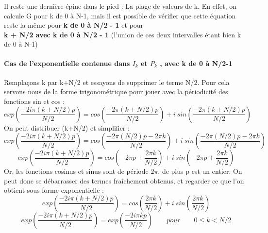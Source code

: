 \documentclass{article}
\begin{document}
Il reste une dernière épine dans le pied : La plage de valeurs de k. En effet, on calcule G pour k de 0 à N-1, mais il est possible de vérifier que cette équation reste la même pour \textbf{k de 0 à N/2 - 1} et pour \\\textbf{k + N/2 avec k de 0 à N/2 - 1} (l'union de ces deux intervalles étant bien k de 0 à N-1)\\~\\

\noindent\qquad \textbf{Cas de l'exponentielle contenue dans $I_{k}$ et $P_{k}$ , avec k de 0 à N/2-1}\\~\\
Remplaçons k par k+N/2 et essayons de supprimer le terme N/2. Pour cela servons nous de la forme trigonométrique pour jouer avec la périodicité des fonctions sin et cos :
\begin{equation}
	exp(\frac{-2i\pi (k+N/2)p}{N/2}) = cos(\frac{-2\pi (k+N/2)p}{N/2})+i\:sin(\frac{-2\pi (k+N/2)p}{N/2})
\end{equation}
On peut distribuer (k+N/2) et simplifier :
\begin{equation}
	exp(\frac{-2i\pi (k+N/2)p}{N/2}) = cos(\frac{-2\pi (N/2)p-2\pi k}{N/2})+i\:sin(\frac{-2\pi (N/2)p-2\pi k}{N/2})
\end{equation}
\begin{equation}
	exp(\frac{-2i\pi (k+N/2)p}{N/2}) = cos(-2\pi p+\frac{2\pi k}{N/2})+i\:sin(-2\pi p+\frac{2\pi k}{N/2})
\end{equation}
Or, les fonctions cosinus et sinus sont de période $2\pi$, de plus p est un entier. On peut donc se débarrasser des termes fraîchement obtenus, et regarder ce que l'on obtient sous forme exponentielle :
\begin{equation}
	exp(\frac{-2i\pi (k+N/2)p}{N/2}) = cos(\frac{2\pi k}{N/2})+i\:sin(\frac{2\pi k}{N/2})
\end{equation}
\begin{equation}
	exp(\frac{-2i\pi (k+N/2)p}{N/2}) = exp(\frac{-2i\pi kp}{N/2}) \qquad pour \qquad 0 \leq k < N/2
\end{equation}
\end{document}
